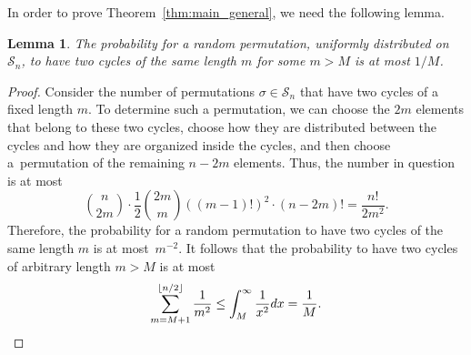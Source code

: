 \documentclass[12pt]%
{amsart}
\renewcommand\S{{\mathcal S}}
\newcommand{\la}{{\lambda}}
\newcommand{\si}{{\sigma}}
\def\magenta#1{{\color{magenta}{#1}}}
\theoremstyle{plain}
\newtheorem{lemma}[theorem]{Lemma}
\theoremstyle{definition}
\theoremstyle{remark}
\newcommand{\todo}[1]{\vspace{5 mm}\par \noindent
	\marginpar{\textsc{ToDo}} \framebox{\begin{minipage}[c]{0.95
				\textwidth}
			#1 \end{minipage}}\vspace{5 mm}\par}
\begin{document}
In order to prove Theorem~\ref{thm:main_general}, 
we need the following lemma.

\begin{lemma}\label{lem:equalcycles}
    The probability for a random permutation, uniformly distributed on~$\S_n$, to have two cycles of the same length $m$ for some $m > M$  is at most $1/M$.
\end{lemma}
\begin{proof}
    Consider the number of permutations $\si\in\S_n$ that have two cycles of a fixed length $m$. To determine such a permutation, we can choose the $2m$ elements that belong to these two cycles, choose how they are distributed between the cycles and how they are organized inside the cycles, and then choose a~permutation of the remaining $n-2m$ elements. Thus, the number in question is at most
    \[
        \binom{n}{2m} \cdot \frac{1}{2} \binom{2m}{m} ((m-1)!)^2\cdot (n-2m)!
        = \frac{n!}{2m^2}.
    \]
    Therefore, the probability for a random permutation to have two cycles of the same length $m$ is at most~$m^{-2}$. It follows that the probability to have two cycles of arbitrary length $m>M$ is at most
    \[
        \sum_{m=M+1}^{\lfloor n/2\rfloor}\frac 1{m^2}
        \le \int_{M}^{\infty}\frac1{x^2}dx 
        = \frac1{M}.
        \qedhere
    \]
\end{proof}


\end{document}
